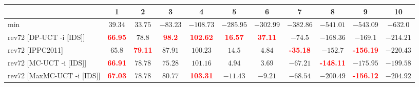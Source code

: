 \documentclass{article}
\begin{document}
\begin{tabular}{|l|r@{$\pm$}rr@{$\pm$}rr@{$\pm$}rr@{$\pm$}rr@{$\pm$}rr@{$\pm$}rr@{$\pm$}rr@{$\pm$}rr@{$\pm$}rr@{$\pm$}r|}
\hline

& \multicolumn{2}{c}{1}
& \multicolumn{2}{c}{2}
& \multicolumn{2}{c}{3}
& \multicolumn{2}{c}{4}
& \multicolumn{2}{c}{5}
& \multicolumn{2}{c}{6}
& \multicolumn{2}{c}{7}
& \multicolumn{2}{c}{8}
& \multicolumn{2}{c}{9}
& \multicolumn{2}{c|}{10}
\\
\hline
\hline
min
& \multicolumn{2}{c}{$39.34$}
& \multicolumn{2}{c}{$33.75$}
& \multicolumn{2}{c}{$-83.23$}
& \multicolumn{2}{c}{$-108.73$}
& \multicolumn{2}{c}{$-285.95$}
& \multicolumn{2}{c}{$-302.99$}
& \multicolumn{2}{c}{$-382.86$}
& \multicolumn{2}{c}{$-541.01$}
& \multicolumn{2}{c}{$-543.09$}
& \multicolumn{2}{c|}{$-632.0$}
\\
rev72 [DP-UCT -i [IDS]]
& \multicolumn{2}{c}{\textbf{\textcolor{red}{66.95}}}
& \multicolumn{2}{c}{$78.8$}
& \multicolumn{2}{c}{\textbf{\textcolor{red}{98.2}}}
& \multicolumn{2}{c}{\textbf{\textcolor{red}{102.62}}}
& \multicolumn{2}{c}{\textbf{\textcolor{red}{16.57}}}
& \multicolumn{2}{c}{\textbf{\textcolor{red}{37.11}}}
& \multicolumn{2}{c}{$-74.5$}
& \multicolumn{2}{c}{$-168.36$}
& \multicolumn{2}{c}{$-169.1$}
& \multicolumn{2}{c|}{$-214.21$}
\\
rev72 [IPPC2011]
& \multicolumn{2}{c}{$65.8$}
& \multicolumn{2}{c}{\textbf{\textcolor{red}{79.11}}}
& \multicolumn{2}{c}{$87.91$}
& \multicolumn{2}{c}{$100.23$}
& \multicolumn{2}{c}{$14.5$}
& \multicolumn{2}{c}{$4.84$}
& \multicolumn{2}{c}{\textbf{\textcolor{red}{-35.18}}}
& \multicolumn{2}{c}{$-152.7$}
& \multicolumn{2}{c}{\textbf{\textcolor{red}{-156.19}}}
& \multicolumn{2}{c|}{$-220.43$}
\\
rev72 [MC-UCT -i [IDS]]
& \multicolumn{2}{c}{\textbf{\textcolor{red}{66.91}}}
& \multicolumn{2}{c}{$78.78$}
& \multicolumn{2}{c}{$75.28$}
& \multicolumn{2}{c}{$101.16$}
& \multicolumn{2}{c}{$4.94$}
& \multicolumn{2}{c}{$3.69$}
& \multicolumn{2}{c}{$-67.21$}
& \multicolumn{2}{c}{\textbf{\textcolor{red}{-148.11}}}
& \multicolumn{2}{c}{$-175.95$}
& \multicolumn{2}{c|}{$-199.58$}
\\
rev72 [MaxMC-UCT -i [IDS]]
& \multicolumn{2}{c}{\textbf{\textcolor{red}{67.03}}}
& \multicolumn{2}{c}{$78.78$}
& \multicolumn{2}{c}{$80.77$}
& \multicolumn{2}{c}{\textbf{\textcolor{red}{103.31}}}
& \multicolumn{2}{c}{$-11.43$}
& \multicolumn{2}{c}{$-9.21$}
& \multicolumn{2}{c}{$-68.54$}
& \multicolumn{2}{c}{$-200.49$}
& \multicolumn{2}{c}{\textbf{\textcolor{red}{-156.12}}}
& \multicolumn{2}{c|}{$-204.92$}

\end{tabular}
\end{document}
